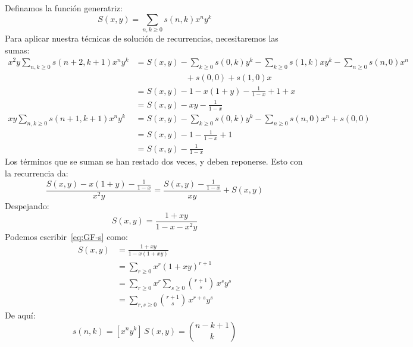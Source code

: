  Definamos la función generatriz:
  \begin{equation}
    \label{eq:recurrence-s-GF}
    S(x, y)
      = \sum_{n, k \ge 0} s(n, k) x^n y^k
  \end{equation}
  Para aplicar nuestra técnicas de solución de recurrencias,
  necesitaremos las sumas:
  \begin{align*}
    x^2 y \sum_{n, k \ge 0} s(n + 2, k + 1) x^n y^k
      &= S(x, y)
	   - \sum_{k \ge 0} s(0, k) y^k
	   - \sum_{k \ge 0} s(1, k) x y^k
	   - \sum_{n \ge 0} s(n, 0) x^n \\
      &\hspace{6em}
	   + s(0, 0)
	   + s(1, 0) x \\
      &= S(x, y)
	   - 1
	   - x (1 + y)
	   - \frac{1}{1 - x}
	   + 1
	   + x \\
      &= S(x, y) - x y - \frac{1}{1 - x} \\
    x y \sum_{n, k \ge 0} s(n + 1, k + 1) x^n y^k
      &= S(x, y)
	   - \sum_{k \ge 0} s(0, k) y^k
	   - \sum_{n \ge 0} s(n, 0) x^n
	   + s(0, 0) \\
      &= S(x, y)
	   - 1
	   - \frac{1}{1 - x}
	   + 1 \\
      &= S(x, y) - \frac{1}{1 - x}
  \end{align*}
  Los términos que se suman se han restado dos veces,
  y deben reponerse.
  Esto con la recurrencia da:
  \begin{equation*}
    \frac{S(x, y)
	    - x (1 + y)
	    - \frac{1}{1 - x}}
	 {x^2 y}
      = \frac{S(x, y) - \frac{1}{1 - x}}{x y}
	  + S(x, y)
  \end{equation*}
  Despejando:
  \begin{equation}
    \label{eq:GF-s}
    S(x, y)
      = \frac{1 + x y}{1 - x - x^2 y}
  \end{equation}
  Podemos escribir~\eqref{eq:GF-s} como:
  \begin{align*}
    S(x, y)
      &= \frac{1 + x y}{1 - x (1 + x y)} \\
      &= \sum_{r \ge 0} x^r (1 + x y)^{r + 1} \\
      &= \sum_{r \ge 0} x^r
	   \sum_{s \ge 0} \binom{r + 1}{s} \, x^s y^s \\
      &= \sum_{r, s \ge 0} \binom{r + 1}{s} \, x^{r + s} y^s
  \end{align*}
  De aquí:
  \begin{equation}
    \label{eq:s(n,k)}
    s(n, k)
      = \left[ x^n y^k \right] \, S(x, y)
      = \binom{n - k + 1}{k}
  \end{equation}

